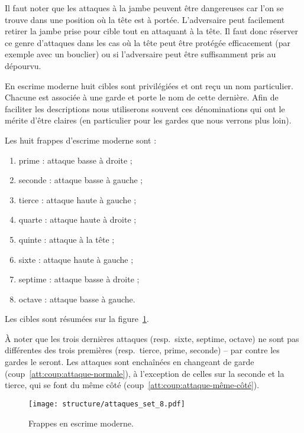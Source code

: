 Il faut noter que les attaques à la jambe peuvent être dangereuses car l'on se trouve dans une position où la tête est à portée.
L'adversaire peut facilement retirer la jambe prise pour cible tout en attaquant à la tête.
Il faut donc réserver ce genre d'attaques dans les cas où la tête peut être protégée efficacement (par exemple avec un bouclier) ou si l'adversaire peut être suffisamment pris au dépourvu.

En escrime moderne huit cibles sont privilégiées et ont reçu un nom particulier.
Chacune est associée à une garde et porte le nom de cette dernière.
Afin de faciliter les descriptions nous utiliserons souvent ces dénominations qui ont le mérite d'être claires (en particulier pour les gardes que nous verrons plus loin).


\begin{coup}
\label{att:coup:série-8}

\noindent
Les huit frappes d'escrime moderne sont :
\begin{enumerate}
	\item prime : attaque basse à droite ;
	\item seconde : attaque basse à gauche ;
	\item tierce : attaque haute à gauche ;
	\item quarte : attaque haute à droite ;
	\item quinte : attaque à la tête ;
	\item sixte : attaque haute à gauche ;
	\item septime : attaque basse à droite ;
	\item octave : attaque basse à gauche.
\end{enumerate}

Les cibles sont résumées sur la figure~\ref{att:fig:série-8}.
\end{coup}


À noter que les trois dernières attaques (resp.\ sixte, septime, octave) ne sont pas différentes des trois premières (resp.\ tierce, prime, seconde) -- par contre les gardes le seront.
Les attaques sont enchaînées en changeant de garde (coup~\ref{att:coup:attaque-normale}), à l'exception de celles sur la seconde et la tierce, qui se font du même côté (coup~\ref{att:coup:attaque-même-côté}).


\begin{figure}[ht]
	\centering
	\texttt{[image: structure/attaques\_set\_8.pdf]}
	\caption{Frappes en escrime moderne.}
	\label{att:fig:série-8}
\end{figure}


